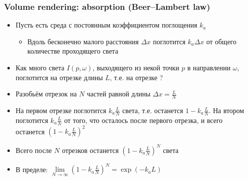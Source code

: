 \documentclass[10pt]{beamer}
\begin{document}
\begin{frame}[fragile]
\frametitle{Volume rendering: absorption (Beer–Lambert law)}
\begin{itemize}
\item Пусть есть среда с постоянным коэффициентом поглощения \begin{math}k_a\end{math}
\pause
\begin{itemize}
\item Вдоль бесконечно малого расстояния \begin{math}\Delta x\end{math} поглотится \begin{math}k_a \Delta x\end{math} от общего количестве проходящего света
\end{itemize}
\pause
\item Как много света \begin{math}I(p,\omega)\end{math}, выходящего из некой точки \begin{math}p\end{math} в направлении \begin{math}\omega\end{math}, поглотится на отрезке длины \begin{math}L\end{math}, т.е. на отрезке \begin{math}[p, p + L\omega]\end{math}?
\pause
\item Разобьём отрезок на \begin{math}N\end{math} частей равной длины \begin{math}\Delta x = \frac{L}{N}\end{math}
\pause
\item На первом отрезке поглотится \begin{math}k_a \frac{L}{N}\end{math} света, т.е. останется \begin{math}1 - k_a\frac{L}{N}\end{math}. На втором поглотится \begin{math}k_a \frac{L}{N}\end{math} от того, что осталось после первого отрезка, и всего останется \begin{math}\left(1 - k_a\frac{L}{N}\right)^2\end{math}
\pause
\item Всего после \begin{math}N\end{math} отрезков останется \begin{math}\left(1 - k_a\frac{L}{N}\right)^N\end{math} света
\pause
\item В пределе: \begin{math}\lim\limits_{N \rightarrow \infty} \left(1 - k_a\frac{L}{N}\right)^N = \exp(- k_a L)\end{math}
\end{itemize}
\end{frame}
\end{document}
